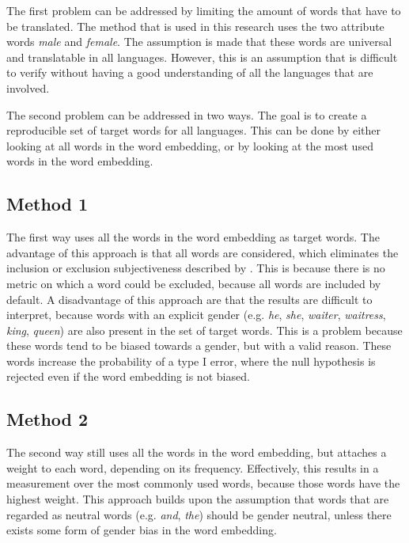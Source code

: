 The first problem can be addressed by limiting the amount of words that have to be
translated. The method that is used in this research uses the two attribute words 
\textit{male} and \textit{female}. The assumption is made that these words are universal
and translatable in all languages. However, this is an assumption that is difficult to
verify without having a good understanding of all the languages that are involved.

The second problem can be addressed in two ways. The goal is to create a reproducible
set of target words for all languages. This can be done by either looking at all words
in the
word embedding, or by looking at the most used words in the word embedding.

\subsection{Method 1}
\label{method:1}
The first way uses
all the words in the word embedding as target words. The advantage of this approach is
that all words are considered, which eliminates the inclusion or exclusion subjectiveness
described by \textcite{nissim_fair_is_better_2020}.  This is because there is no metric
on which a word could be excluded, because all words are included by default.
A disadvantage of this approach
are that the results are difficult to interpret, because words with an explicit
gender (e.g. \textit{he}, \textit{she}, \textit{waiter}, \textit{waitress},
\textit{king}, \textit{queen}) are also
present in the set of target words. This is a problem because these words tend to be biased
towards a gender, but with a valid reason. These words increase the probability of a
type I error, where the null hypothesis is rejected even if the word embedding is not
biased.

\subsection{Method 2}
\label{method:2}
The second way still uses all the words in the word embedding, but attaches a weight to
each word, depending on its frequency. Effectively, this results in a measurement over
the most commonly used words, because those words have the highest weight.
This approach builds upon the assumption that words that are regarded as neutral words
(e.g. \textit{and}, \textit{the}) should be gender neutral, unless there exists some form
of gender bias in the word embedding.


